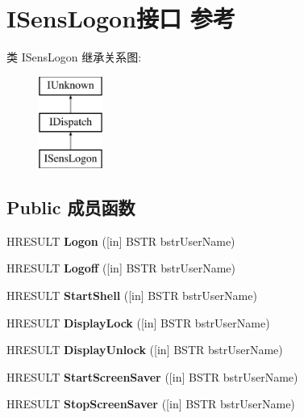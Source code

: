 \hypertarget{interface_i_sens_logon}{}\section{I\+Sens\+Logon接口 参考}
\label{interface_i_sens_logon}
类 I\+Sens\+Logon 继承关系图\+:\begin{figure}[H]
\begin{center}
\leavevmode
\includegraphics[height=3.000000cm]{interface_i_sens_logon}
\end{center}
\end{figure}
\subsection*{Public 成员函数}
\begin{DoxyCompactItemize}
\item 
\mbox{\label{interface_i_sens_logon_a9c4babee743c13c8db66df1edee7f5cc}} 
H\+R\+E\+S\+U\+LT {\bfseries Logon} (\mbox{[}in\mbox{]} B\+S\+TR bstr\+User\+Name)
\item 
\mbox{\label{interface_i_sens_logon_a103aed1b066d1cbd2c7d0f4c4a85237d}} 
H\+R\+E\+S\+U\+LT {\bfseries Logoff} (\mbox{[}in\mbox{]} B\+S\+TR bstr\+User\+Name)
\item 
\mbox{\label{interface_i_sens_logon_af4dc456d86f655d734236653f14eb4f9}} 
H\+R\+E\+S\+U\+LT {\bfseries Start\+Shell} (\mbox{[}in\mbox{]} B\+S\+TR bstr\+User\+Name)
\item 
\mbox{\label{interface_i_sens_logon_a64649f48c2ac9313bb6c79564efa16da}} 
H\+R\+E\+S\+U\+LT {\bfseries Display\+Lock} (\mbox{[}in\mbox{]} B\+S\+TR bstr\+User\+Name)
\item 
\mbox{\label{interface_i_sens_logon_a656b6afeeaa3d21718635de69776c78c}} 
H\+R\+E\+S\+U\+LT {\bfseries Display\+Unlock} (\mbox{[}in\mbox{]} B\+S\+TR bstr\+User\+Name)
\item 
\mbox{\label{interface_i_sens_logon_adf07ab9340e3282ec8eab7094b34b462}} 
H\+R\+E\+S\+U\+LT {\bfseries Start\+Screen\+Saver} (\mbox{[}in\mbox{]} B\+S\+TR bstr\+User\+Name)
\item 
\mbox{\label{interface_i_sens_logon_a1f68b026b9a0efb84507d9f34f71ac4b}} 
H\+R\+E\+S\+U\+LT {\bfseries Stop\+Screen\+Saver} (\mbox{[}in\mbox{]} B\+S\+TR bstr\+User\+Name)
\end{DoxyCompactItemize}
